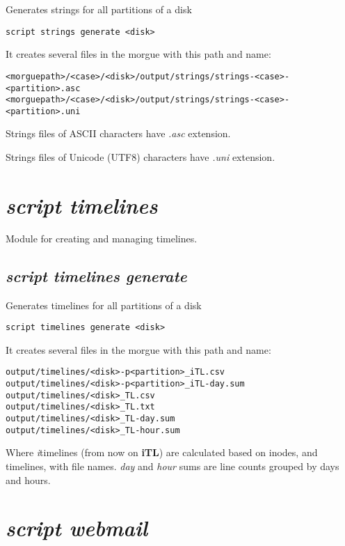 \documentclass[a4paper,11pt,oneside]{report}
\begin{document}
Generates strings for all partitions of a disk 

\begin{verbatim}
script strings generate <disk>
\end{verbatim}

It creates several files in the morgue with this path and name:

\begin{verbatim}
<morguepath>/<case>/<disk>/output/strings/strings-<case>-<partition>.asc
<morguepath>/<case>/<disk>/output/strings/strings-<case>-<partition>.uni
\end{verbatim}

Strings files of ASCII characters have \emph{.asc} extension.

Strings files of Unicode (UTF8) characters have \emph{.uni} extension.





\section{\emph{script timelines}}

Module for creating and managing timelines.

\subsection{\emph{script timelines generate}} 

Generates timelines for all partitions of a disk

\begin{verbatim}
script timelines generate <disk>
\end{verbatim}

It creates several files in the morgue with this path and name:

\begin{verbatim}
output/timelines/<disk>-p<partition>_iTL.csv
output/timelines/<disk>-p<partition>_iTL-day.sum
output/timelines/<disk>_TL.csv
output/timelines/<disk>_TL.txt
output/timelines/<disk>_TL-day.sum
output/timelines/<disk>_TL-hour.sum
\end{verbatim}

Where \emph{i}timelines (from now on \textbf{iTL}) are calculated based on inodes, and timelines, with file names. \emph{day} and \emph{hour} sums are line counts grouped by days and hours.




\section{\emph{script webmail}}
\end{document}
